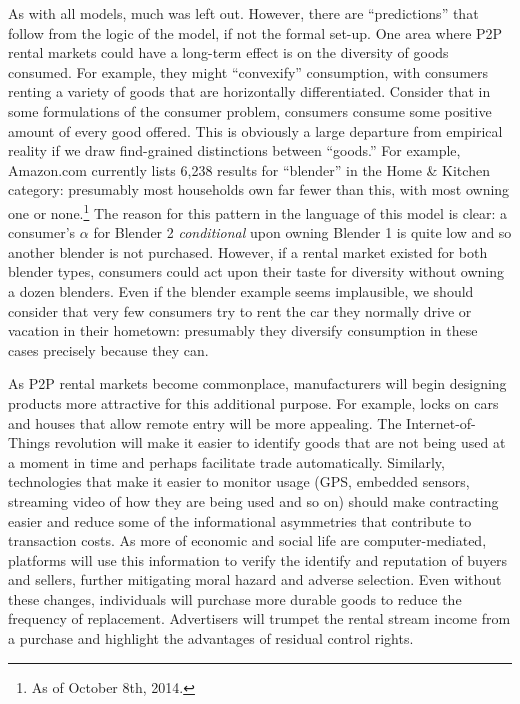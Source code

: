 \documentclass[11pt]{article}
\begin{document}
As with all models, much was left out. 
However, there are ``predictions'' that follow from the logic of the model, if not the formal set-up. 
One area where P2P rental markets could have a long-term effect is on the diversity of goods consumed. 
For example, they might ``convexify'' consumption, with consumers renting a variety of goods that are horizontally differentiated.   
Consider that in some formulations of the consumer problem, consumers consume some positive amount of every good offered.
This is obviously a large departure from empirical reality if we draw find-grained distinctions between ``goods.'' 
For example, Amazon.com currently lists 6,238 results for ``blender'' in the Home \& Kitchen category: 
presumably most households own far fewer than this, with most owning one or none.\footnote{As of October 8th, 2014.}
The reason for this pattern in the language of this model is clear: 
a consumer's $\alpha$ for Blender 2 \emph{conditional} upon owning Blender 1 is quite low and so another blender is not purchased.
However, if a rental market existed for both blender types, consumers could act upon their taste for diversity without owning a dozen blenders. 
Even if the blender example seems implausible, we should consider that very few consumers try to rent the car they normally drive or vacation in their hometown: presumably they diversify consumption in these cases precisely because they can. 

As P2P rental markets become commonplace, manufacturers will begin designing products more attractive for this additional purpose. 
For example, locks on cars and houses that allow remote entry will be more appealing. 
The Internet-of-Things revolution will make it easier to identify goods that are not being used at a moment in time and perhaps facilitate trade automatically. 
Similarly, technologies that make it easier to monitor usage (GPS, embedded sensors, streaming video of how they are being used and so on) should make contracting easier and reduce some of the informational asymmetries that contribute to transaction costs. 
As more of economic and social life are computer-mediated, platforms will use this information to verify the identify and reputation of buyers and sellers, further mitigating moral hazard and adverse selection.  
Even without these changes, individuals will purchase more durable goods to reduce the frequency of replacement. 
Advertisers will trumpet the rental stream income from a purchase and highlight the advantages of residual control rights. 

\end{document}
